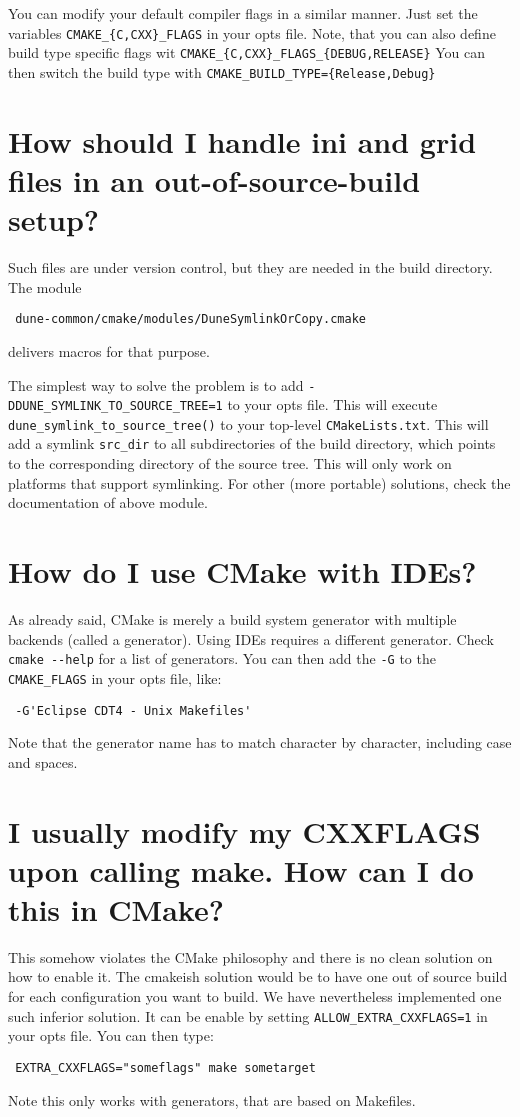 \documentclass[a4paper,10pt,DIV9,headings=small]{scrartcl}
\begin{document}
You can modify your default compiler flags in a similar manner. Just set the variables \lstinline!CMAKE_{C,CXX}_FLAGS! in your opts file. Note, that you can also define build type specific flags wit \lstinline!CMAKE_{C,CXX}_FLAGS_{DEBUG,RELEASE}! You can then switch the build type with \lstinline!CMAKE_BUILD_TYPE={Release,Debug}!

\section{How should I handle ini and grid files in an out-of-source-build setup?}
\label{inifiles}
Such files are under version control, but they are needed in the build directory. The module
\begin{lstlisting}
 dune-common/cmake/modules/DuneSymlinkOrCopy.cmake
\end{lstlisting}
delivers macros for that purpose.

The simplest way to solve the problem is to add  \verb!-DDUNE_SYMLINK_TO_SOURCE_TREE=1! to your opts file. This will execute \lstinline!dune_symlink_to_source_tree()! to your top-level \lstinline!CMakeLists.txt!. This will add a symlink \lstinline!src_dir! to all subdirectories of the build directory, which points to the corresponding directory of the source tree. This will only work on platforms that support symlinking. For other (more portable) solutions, check the documentation of above module.

\section{How do I use CMake with IDEs?}
\label{ides}
As already said, CMake is merely a build system generator with multiple backends (called a generator). Using IDEs requires a different generator. Check \lstinline!cmake --help! for a list of generators. You can then add the \lstinline!-G! to the \verb!CMAKE_FLAGS! in your opts file, like:
\begin{lstlisting}
 -G'Eclipse CDT4 - Unix Makefiles'
\end{lstlisting}
Note that the generator name has to match character by character, including case and spaces.

\section{I usually modify my CXXFLAGS upon calling make. How can I do this in CMake?}
\label{cxxflags}
This somehow violates the CMake philosophy and there is no clean solution on how to enable it. The cmakeish solution would be to have one out of source build for each configuration you want to build. We have nevertheless implemented one such inferior solution. It can be enable by setting \lstinline!ALLOW_EXTRA_CXXFLAGS=1! in your opts file. You can then type:
\begin{lstlisting}
 EXTRA_CXXFLAGS="someflags" make sometarget
\end{lstlisting}
Note this only works with generators, that are based on Makefiles.
\end{document}
